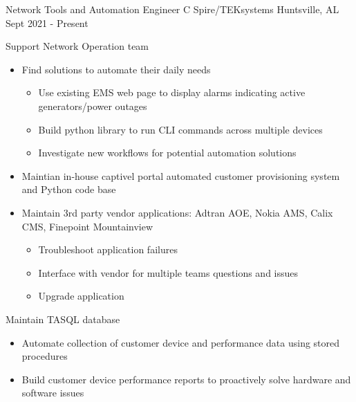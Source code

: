 
\begin{cventries}
  \cventry
    {Network Tools and Automation Engineer} %
    {C Spire/TEKsystems} %
    {Huntsville, AL} %
    {Sept 2021 - Present} %
    {
      \begin{cvitems} %
        \item {Support Network Operation team}
            \begin{itemize}
                \item {Find solutions to automate their daily needs}
                    \begin{itemize}
                        \item {Use existing EMS web page to display alarms indicating active generators/power outages}
                        \item {Build python library to run CLI commands across multiple devices}
                        \item {Investigate new workflows for potential automation solutions}
                    \end{itemize}
                \item {Maintian in-house captivel portal automated customer provisioning system and Python code base}
                \item {Maintain 3rd party vendor applications: Adtran AOE, Nokia AMS, Calix CMS, Finepoint Mountainview}
                    \begin{itemize}
                        \item {Troubleshoot application failures}
                        \item {Interface with vendor for multiple teams questions and issues}
                        \item {Upgrade application}
                    \end{itemize}
            \end{itemize}
        \item {Maintain TASQL database}
            \begin{itemize}
                \item {Automate collection of customer device and performance data using stored procedures}
                \item {Build customer device performance reports to proactively solve hardware and software issues}
            \end{itemize}

\end{cvitems}}
\end{cventries}
